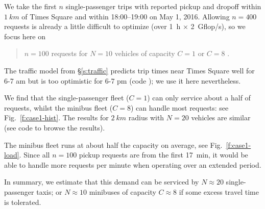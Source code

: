 \documentclass[12pt,notitlepage]{article}
\begin{document}
\edef\codecaseone{\thecodeindex}

We take
the first $n$ single-passenger trips 
with
reported pickup and dropoff 
within
$\SI{1}{km}$ of Times Square
and
within 
18:00--19:00 on May 1, 2016.
%
%	
Allowing $n = 400$ requests
is already a little difficult 
to optimize (over \SI{1}{h} $\times$ \SI{2}{Gflop/s}),
so we focus here on
\begin{quote}
	$n = 100$ requests
	for
	$N = 10$ vehicles of capacity $C = 1$ or $C = 8$
	.
\end{quote}


%

The traffic model from \S\ref{s:traffic} predicts trip times
near Times Square well for 6-7 am
but is too optimistic for 6-7 pm 
(code );
we use it here nevertheless.
%
\edef\codetriptime{\thecodeindex}

%

We find that the single-passenger fleet ($C = 1$)
can only service about a half of requests,
whilst
the minibus fleet ($C = 8$) can handle most requests:
see Fig.~\ref{f:case1-hist}.
%
%
The results for $\SI{2}{km}$ radius with $N = 20$ 
vehicles are similar (see code \codereref{\codecaseone} to browse the results).

%

The minibus fleet runs at about half the capacity on average, see Fig.~\ref{f:case1-load}.
%
Since all $n = 100$ pickup requests are from the first \SI{17}{min},
it would be able to handle more requests per minute
when operating over an extended period.

%

In summary,
we estimate that this demand can be serviced by 
	$N \approx 20$ single-passenger taxis; or
	$N \approx 10$ minibuses of capacity $C \approx 8$
	if some excess travel time is tolerated.

%
\end{document}
